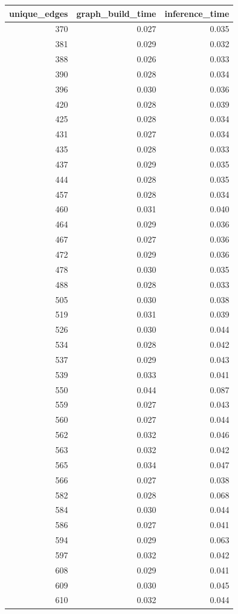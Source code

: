 \begin{tabular}{rrr}
\toprule
unique_edges & graph_build_time & inference_time \\
\midrule
370 & 0.027 & 0.035 \\
381 & 0.029 & 0.032 \\
388 & 0.026 & 0.033 \\
390 & 0.028 & 0.034 \\
396 & 0.030 & 0.036 \\
420 & 0.028 & 0.039 \\
425 & 0.028 & 0.034 \\
431 & 0.027 & 0.034 \\
435 & 0.028 & 0.033 \\
437 & 0.029 & 0.035 \\
444 & 0.028 & 0.035 \\
457 & 0.028 & 0.034 \\
460 & 0.031 & 0.040 \\
464 & 0.029 & 0.036 \\
467 & 0.027 & 0.036 \\
472 & 0.029 & 0.036 \\
478 & 0.030 & 0.035 \\
488 & 0.028 & 0.033 \\
505 & 0.030 & 0.038 \\
519 & 0.031 & 0.039 \\
526 & 0.030 & 0.044 \\
534 & 0.028 & 0.042 \\
537 & 0.029 & 0.043 \\
539 & 0.033 & 0.041 \\
550 & 0.044 & 0.087 \\
559 & 0.027 & 0.043 \\
560 & 0.027 & 0.044 \\
562 & 0.032 & 0.046 \\
563 & 0.032 & 0.042 \\
565 & 0.034 & 0.047 \\
566 & 0.027 & 0.038 \\
582 & 0.028 & 0.068 \\
584 & 0.030 & 0.044 \\
586 & 0.027 & 0.041 \\
594 & 0.029 & 0.063 \\
597 & 0.032 & 0.042 \\
608 & 0.029 & 0.041 \\
609 & 0.030 & 0.045 \\
610 & 0.032 & 0.044 \\

\end{tabular}
